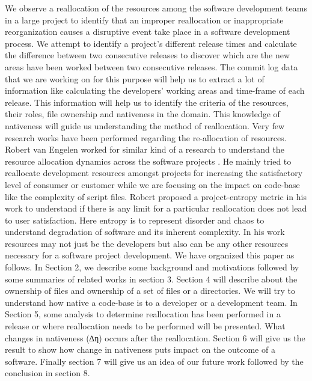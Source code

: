 \documentclass{acm_proc_article-sp}
\begin{document}
We observe a reallocation of the resources among the software development teams in a large project to identify that an improper reallocation or inappropriate reorganization causes a disruptive event take place in a software development process. We attempt to identify a project's different release times and calculate the difference between two consecutive releases to discover which are the new areas have been worked between two consecutive releases. The commit log data that we are working on for this purpose will help us to extract a lot of information like calculating the developers' working areas and time-frame of each release. This information will help us to identify the criteria of the resources, their roles, file ownership and nativeness in the domain. This knowledge of nativeness will guide us understanding the method of reallocation.
Very few research works have been performed regarding the re-allocation of resources.  Robert van Engelen worked for similar kind of a research to understand the resource allocation dynamics across the software projects \cite{2_datta}. He mainly tried to reallocate development resources amongst projects for increasing the satisfactory level of consumer or customer while we are focusing on the impact on code-base like the complexity of script files. Robert proposed a project-entropy metric in his work to understand if there is any limit for a particular reallocation does not lead to user satisfaction. Here entropy is to represent disorder and chaos to understand degradation of software and its inherent complexity. In his work resources may not just be the developers but also can be any other resources necessary for a software project development.
We have organized this paper as follows. In Section 2, we describe some background and motivations followed by some summaries of related works in section 3. Section 4 will describe about the ownership of files and ownership of a set of files or a directories. We will try to understand how native a code-base is to a developer or a development team. In Section 5, some analysis to determine reallocation has been performed in a release or where reallocation needs to be performed will be presented. What changes in nativeness (∆ƞ) occurs after the reallocation. Section 6 will give us the result to show how change in nativeness puts impact on the outcome of a software. Finally section 7 will give us an idea of our future work followed by the conclusion in section 8.
\end{document}
